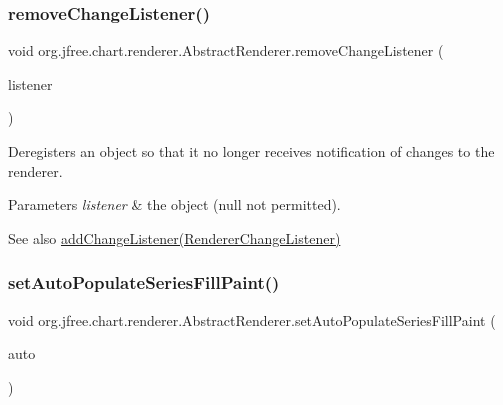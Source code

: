 \subsubsection{\texorpdfstring{remove\+Change\+Listener()}{removeChangeListener()}}
{\footnotesize\ttfamily void org.\+jfree.\+chart.\+renderer.\+Abstract\+Renderer.\+remove\+Change\+Listener (\begin{DoxyParamCaption}\item[{\mbox{\hyperlink{interfaceorg_1_1jfree_1_1chart_1_1event_1_1_renderer_change_listener}{Renderer\+Change\+Listener}}}]{listener }\end{DoxyParamCaption})}

Deregisters an object so that it no longer receives notification of changes to the renderer.


\begin{DoxyParams}{Parameters}
{\em listener} & the object ({\ttfamily null} not permitted).\\
\hline
\end{DoxyParams}
\begin{DoxySeeAlso}{See also}
\mbox{\hyperlink{classorg_1_1jfree_1_1chart_1_1renderer_1_1_abstract_renderer_a3b6e875102983611e9dfcd174b810920}{add\+Change\+Listener(\+Renderer\+Change\+Listener)}} 
\end{DoxySeeAlso}
\mbox{\label{classorg_1_1jfree_1_1chart_1_1renderer_1_1_abstract_renderer_a93616ea6bf29500cc4b9d632f676c204}} 
\subsubsection{\texorpdfstring{set\+Auto\+Populate\+Series\+Fill\+Paint()}{setAutoPopulateSeriesFillPaint()}}
{\footnotesize\ttfamily void org.\+jfree.\+chart.\+renderer.\+Abstract\+Renderer.\+set\+Auto\+Populate\+Series\+Fill\+Paint (\begin{DoxyParamCaption}\item[{boolean}]{auto }\end{DoxyParamCaption})}

